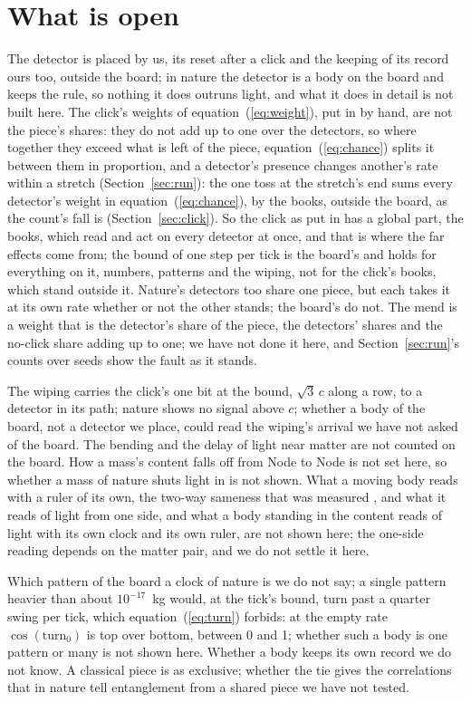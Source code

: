 \documentclass[pdflatex,sn-mathphys-num]{sn-jnl}
\begin{document}
\section{What is open}\label{sec:open}

The detector is placed by us, its reset after a click and the keeping of its record ours too, outside the board; in nature the detector is a body on the board and keeps the rule, so nothing it does outruns light, and what it does in detail is not built here. The click's weights of equation~(\ref{eq:weight}), put in by hand, are not the piece's shares: they do not add up to one over the detectors, so where together they exceed what is left of the piece, equation~(\ref{eq:chance}) splits it between them in proportion, and a detector's presence changes another's rate within a stretch (Section~\ref{sec:run}): the one toss at the stretch's end sums every detector's weight in equation~(\ref{eq:chance}), by the books, outside the board, as the count's fall is (Section~\ref{sec:click}). So the click as put in has a global part, the books, which read and act on every detector at once, and that is where the far effects come from; the bound of one step per tick is the board's and holds for everything on it, numbers, patterns and the wiping, not for the click's books, which stand outside it. Nature's detectors too share one piece, but each takes it at its own rate whether or not the other stands; the board's do not. The mend is a weight that is the detector's share of the piece, the detectors' shares and the no-click share adding up to one; we have not done it here, and Section~\ref{sec:run}'s counts over seeds show the fault as it stands.

The wiping carries the click's one bit at the bound, $\sqrt3\,c$ along a row, to a detector in its path; nature shows no signal above $c$; whether a body of the board, not a detector we place, could read the wiping's arrival we have not asked of the board. The bending and the delay of light near matter are not counted on the board. How a mass's content falls off from Node to Node is not set here, so whether a mass of nature shuts light in is not shown. What a moving body reads with a ruler of its own, the two-way sameness that was measured \cite{michelson1887}, and what it reads of light from one side, and what a body standing in the content reads of light with its own clock and its own ruler, are not shown here; the one-side reading depends on the matter pair, and we do not settle it here.

Which pattern of the board a clock of nature is we do not say; a single pattern heavier than about $10^{-17}$~kg would, at the tick's bound, turn past a quarter swing per tick, which equation~(\ref{eq:turn}) forbids: at the empty rate $\cos(\mathrm{turn}_0)$ is top over bottom, between 0 and 1; whether such a body is one pattern or many is not shown here. Whether a body keeps its own record we do not know. A classical piece is as exclusive; whether the tie gives the correlations that in nature tell entanglement from a shared piece we have not tested.
\end{document}
